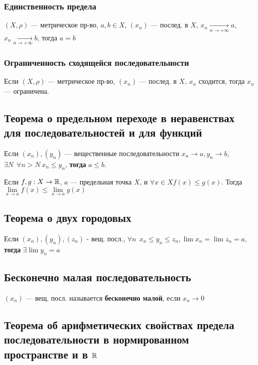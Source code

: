 \subsubsection{Единственность предела}

$(X,\rho)$ --- метрическое пр-во, $a,b\in X$, $(x_n)$ --- послед. в $X$,
$x_n\xrightarrow[n\to +\infty]{} a$, $x_n\xrightarrow[n\to +\infty]{} b$,
тогда $a=b$

\subsubsection{Ограниченность сходящейся последовательности}

Если $(X,\rho)$ --- метрическое пр-во, $(x_n)$ --- послед. в $X$, $x_n$ сходится, тогда $x_n$ --- ограничена.

\subsection{Теорема о предельном переходе в неравенствах для последовательностей и для функций}

Если $(x_n),(y_n)$ --- вещественные последовательности $x_n\to a, y_n\to b$, $\exists N \ \ \forall n > N \ x_n\leq y_n$, \textbf{тогда} $a\leq b$.

Если $f, g:X\to \operatorname*{\mathbb{R}}$, $a$ --- предельная точка $X$, и $\forall x\in X f(x)\leq g(x)$. Тогда $\lim\limits_{x\to a}f(x)\leq \lim\limits_{x\to a}g(x)$ 

\subsection{Теорема о двух городовых}

Если $(x_n),(y_n),(z_n)$ - вещ. посл., $\forall n \ \ x_n\leq y_n\leq z_n, \lim x_n=\lim z_n =a$, \textbf{тогда} $\exists \lim y_n=a$

\subsection{Бесконечно малая последовательность}

$(x_n)$ --- вещ. посл. называется \textbf{бесконечно малой}, если $x_n\to 0$

\subsection{Теорема об арифметических свойствах предела последовательности в нормированном пространстве и в $\operatorname*{\mathbb{R}}$}

